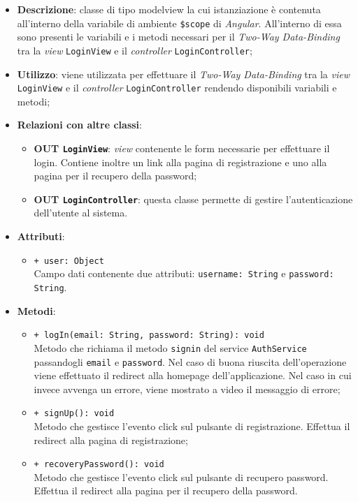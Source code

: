 	\begin{itemize}
		\item \textbf{Descrizione}: classe di tipo modelview la cui istanziazione è contenuta all'interno della variabile di ambiente \texttt{\$scope} di \textit{Angular}. All'interno di essa sono presenti le variabili e i metodi necessari per il \textit{Two-Way Data-Binding} tra la \textit{view} \texttt{LoginView} e il \textit{controller} \texttt{LoginController};
		\item \textbf{Utilizzo}: viene utilizzata per effettuare il \textit{Two-Way Data-Binding} tra la \textit{view} \texttt{LoginView} e il \textit{controller} \texttt{LoginController} rendendo disponibili variabili e metodi;
		\item \textbf{Relazioni con altre classi}: 
		\begin{itemize}
			\item \textbf{OUT \texttt{LoginView}}: \textit{view} contenente le form necessarie per effettuare il login. Contiene inoltre un link alla pagina di registrazione e uno alla pagina per il recupero della password; 
			\item \textbf{OUT \texttt{LoginController}}: questa classe permette di gestire l'autenticazione dell'utente al sistema.
		\end{itemize}
		\item \textbf{Attributi}: 
		\begin{itemize}
				\item \texttt{+ user: Object} \\ Campo dati contenente due attributi: \texttt{username: String} e \texttt{password: String}.
		\end{itemize}
		\item \textbf{Metodi}: 
		\begin{itemize}
			\item \texttt{+ logIn(email: String, password: String): void} \\
			Metodo che richiama il metodo \texttt{signin} del service \texttt{AuthService} passandogli \texttt{email} e \texttt{password}. Nel caso di buona riuscita dell'operazione viene effettuato il redirect alla homepage dell'applicazione. Nel caso in cui invece avvenga un errore, viene mostrato a video il messaggio di errore;
			\item \texttt{+ signUp(): void} \\
			Metodo che gestisce l’evento click sul pulsante di registrazione. Effettua il redirect alla pagina di registrazione;
			\item \texttt{+ recoveryPassword(): void} \\
			Metodo che gestisce l’evento click sul pulsante di recupero password. Effettua il redirect alla pagina per il recupero della password.
		\end{itemize}
	\end{itemize}
	
	